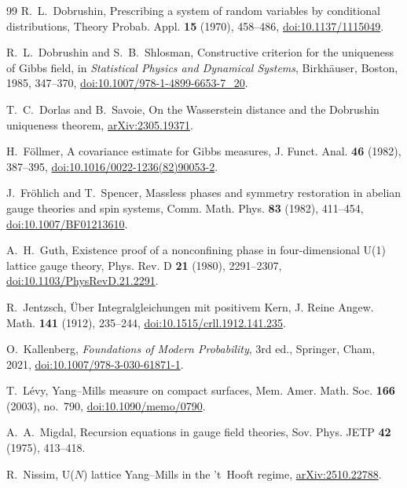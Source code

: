 \documentclass[11pt]{amsart}
\theoremstyle{definition}
\theoremstyle{remark}
\begin{document}
\begin{thebibliography}{99}
R.~L.~Dobrushin, Prescribing a system of random variables by conditional
distributions, Theory Probab. Appl. \textbf{15} (1970), 458--486,
\href{https://doi.org/10.1137/1115049}{doi:10.1137/1115049}.

R.~L.~Dobrushin and S.~B.~Shlosman, Constructive criterion for the uniqueness
of Gibbs field, in \emph{Statistical Physics and Dynamical Systems},
Birkh\"auser, Boston, 1985, 347--370,
\href{https://doi.org/10.1007/978-1-4899-6653-7_20}{doi:10.1007/978-1-4899-6653-7\_20}.

T.~C.~Dorlas and B.~Savoie, On the Wasserstein distance and the Dobrushin
uniqueness theorem, \href{https://arxiv.org/abs/2305.19371}{arXiv:2305.19371}.

H.~F\"ollmer, A covariance estimate for Gibbs measures, J. Funct. Anal.
\textbf{46} (1982), 387--395,
\href{https://doi.org/10.1016/0022-1236(82)90053-2}{doi:10.1016/0022-1236(82)90053-2}.

J.~Fr\"ohlich and T.~Spencer, Massless phases and symmetry restoration in
abelian gauge theories and spin systems, Comm. Math. Phys. \textbf{83} (1982),
411--454, \href{https://doi.org/10.1007/BF01213610}{doi:10.1007/BF01213610}.

A.~H.~Guth, Existence proof of a nonconfining phase in four-dimensional U(1)
lattice gauge theory, Phys. Rev. D \textbf{21} (1980), 2291--2307,
\href{https://doi.org/10.1103/PhysRevD.21.2291}{doi:10.1103/PhysRevD.21.2291}.

R.~Jentzsch, \"Uber Integralgleichungen mit positivem Kern, J. Reine Angew.
Math. \textbf{141} (1912), 235--244,
\href{https://doi.org/10.1515/crll.1912.141.235}{doi:10.1515/crll.1912.141.235}.

O.~Kallenberg, \emph{Foundations of Modern Probability}, 3rd ed., Springer,
Cham, 2021, \href{https://doi.org/10.1007/978-3-030-61871-1}
{doi:10.1007/978-3-030-61871-1}.

T.~L\'evy, Yang--Mills measure on compact surfaces, Mem. Amer. Math. Soc.
\textbf{166} (2003), no.~790,
\href{https://doi.org/10.1090/memo/0790}{doi:10.1090/memo/0790}.

A.~A.~Migdal, Recursion equations in gauge field theories, Sov. Phys. JETP
\textbf{42} (1975), 413--418.

R.~Nissim, U($N$) lattice Yang--Mills in the 't~Hooft regime,
\href{https://arxiv.org/abs/2510.22788}{arXiv:2510.22788}.


\end{thebibliography}
\end{document}

